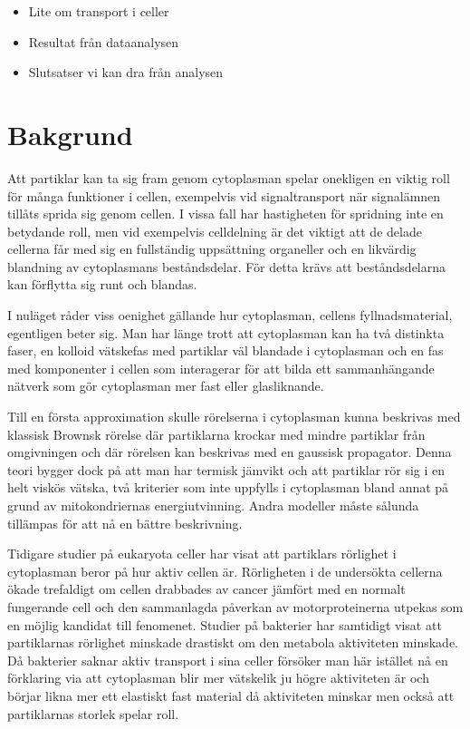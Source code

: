 \begin{itemize}
    \item Lite om transport i celler
    \item Resultat från dataanalysen
    \item Slutsatser vi kan dra från analysen
\end{itemize}


\section{Bakgrund}

Att partiklar kan ta sig fram genom cytoplasman spelar onekligen en viktig roll för många funktioner i cellen, exempelvis vid signaltransport när signalämnen tillåts sprida sig genom cellen. I vissa fall har hastigheten för spridning inte en betydande roll, men vid exempelvis celldelning är det viktigt att de delade cellerna får med sig en fullständig uppsättning organeller och en likvärdig blandning av cytoplasmans beståndsdelar. För detta krävs att beståndsdelarna kan förflytta sig runt och blandas.

I nuläget råder viss oenighet gällande hur cytoplasman, cellens fyllnadsmaterial, egentligen beter sig. Man har länge trott att cytoplasman kan ha två distinkta faser, en kolloid vätskefas med partiklar väl blandade i cytoplasman och en fas med komponenter i cellen som interagerar för att bilda ett sammanhängande nätverk som gör cytoplasman mer fast eller glasliknande.

Till en första approximation skulle rörelserna i cytoplasman kunna beskrivas med klassisk Brownsk rörelse där partiklarna krockar med mindre partiklar från omgivningen och där rörelsen kan beskrivas med en gaussisk propagator. Denna teori bygger dock på att man har termisk jämvikt och att partiklar rör sig i en helt viskös vätska, två kriterier som inte uppfylls i cytoplasman bland annat på grund av mitokondriernas energiutvinning. Andra modeller måste sålunda tillämpas för att nå en bättre beskrivning.

Tidigare studier på eukaryota celler har visat att partiklars rörlighet i cytoplasman beror på hur aktiv cellen är.\cite{Gou_etal2014} Rörligheten i de undersökta cellerna ökade trefaldigt om cellen drabbades av cancer jämfört med en normalt fungerande cell och den sammanlagda påverkan av motorproteinerna utpekas som en möjlig kandidat till fenomenet. Studier på bakterier har samtidigt visat att partiklarnas rörlighet minskade drastiskt om den metabola aktiviteten minskade. \cite{Parry_etal2014} Då bakterier saknar aktiv transport i sina celler försöker man här istället nå en förklaring via att cytoplasman blir mer vätskelik ju högre aktiviteten är och börjar likna mer ett elastiskt fast material då aktiviteten minskar men också att partiklarnas storlek spelar roll.

